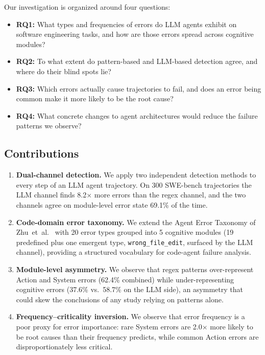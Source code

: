 \documentclass{ieeeaccess}
\begin{document}
Our investigation is organized around four questions:

\begin{itemize}
    \item \textbf{RQ1:} What types and frequencies of errors do LLM agents exhibit on software engineering tasks, and how are those errors spread across cognitive modules?
    \item \textbf{RQ2:} To what extent do pattern-based and LLM-based detection agree, and where do their blind spots lie?
    \item \textbf{RQ3:} Which errors actually cause trajectories to fail, and does an error being common make it more likely to be the root cause?
    \item \textbf{RQ4:} What concrete changes to agent architectures would reduce the failure patterns we observe?
\end{itemize}

\subsection{Contributions}

\begin{enumerate}
    \item \textbf{Dual-channel detection.} We apply two independent detection methods to every step of an LLM agent trajectory. On 300 SWE-bench trajectories the LLM channel finds 8.2$\times$ more errors than the regex channel, and the two channels agree on module-level error state 69.1\% of the time.

    \item \textbf{Code-domain error taxonomy.} We extend the Agent Error Taxonomy of Zhu~et~al.\ \cite{b5} with 20 error types grouped into 5 cognitive modules (19 predefined plus one emergent type, \texttt{wrong\_file\_edit}, surfaced by the LLM channel), providing a structured vocabulary for code-agent failure analysis.

    \item \textbf{Module-level asymmetry.} We observe that regex patterns over-represent Action and System errors (62.4\% combined) while under-representing cognitive errors (37.6\% vs.\ 58.7\% on the LLM side), an asymmetry that could skew the conclusions of any study relying on patterns alone.

    \item \textbf{Frequency--criticality inversion.} We observe that error frequency is a poor proxy for error importance: rare System errors are 2.0$\times$ more likely to be root causes than their frequency predicts, while common Action errors are disproportionately less critical.

\end{enumerate}
\end{document}
